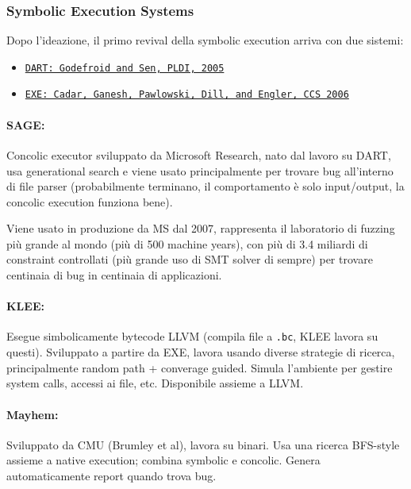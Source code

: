 \subsubsection{Symbolic Execution Systems}

Dopo l'ideazione, il primo revival della symbolic execution arriva con due sistemi:
\begin{itemize}
	\item \href{https://web.eecs.umich.edu/~weimerw/590/reading/p213-godefroid.pdf}{\texttt{DART: Godefroid and Sen, PLDI, 2005}}

	\item \href{https://www.cs.umd.edu/class/fall2023/cmsc614/papers/exe.pdf}{\texttt{EXE: Cadar, Ganesh, Pawlowski, Dill, and Engler, CCS 2006}}
\end{itemize}

\paragraph{SAGE:} Concolic executor sviluppato da Microsoft Research, nato dal lavoro su DART, usa generational search e viene usato principalmente per trovare bug all'interno di file parser (probabilmente terminano, il comportamento è solo input/output, la concolic execution funziona bene). 

Viene usato in produzione da MS dal 2007, rappresenta il laboratorio di fuzzing più grande al mondo (più di 500 machine years), con più di 3.4 miliardi di constraint controllati (più grande uso di SMT solver di sempre) per trovare centinaia di bug in centinaia di applicazioni.

\paragraph{KLEE:} Esegue simbolicamente bytecode LLVM (compila file a \texttt{.bc}, KLEE lavora su questi). Sviluppato a partire da EXE, lavora usando diverse strategie di ricerca, principalmente random path + converage guided. Simula l'ambiente per gestire system calls, accessi ai file, etc. Disponibile assieme a LLVM.

\paragraph{Mayhem:} Sviluppato da CMU (Brumley et al), lavora su binari. Usa una ricerca BFS-style assieme a native execution; combina symbolic e concolic. Genera automaticamente report quando trova bug.

